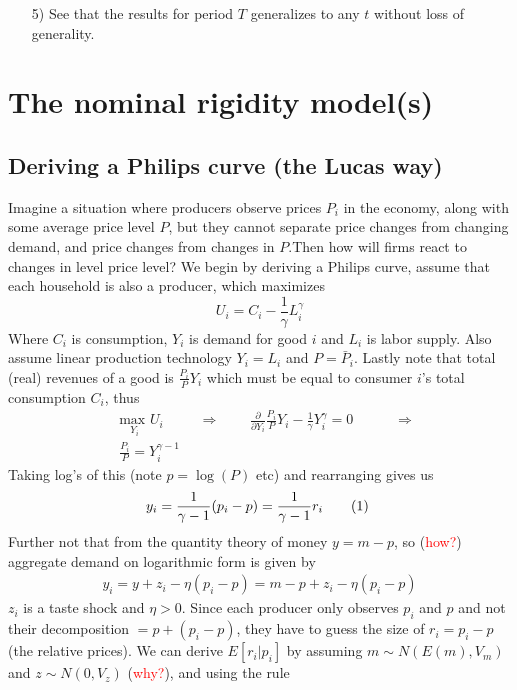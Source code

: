\documentclass[12pt, a4paper]{article}
\begin{document}
\begin{spacing}{1.213}
\begin{itemize}
\item[5)] See that the results for period $T$ generalizes to any $t$ without loss of generality.
\end{itemize}


\section{The nominal rigidity model(s)}
\subsection{Deriving a Philips curve (the Lucas way)}
Imagine a situation where producers observe prices $P_i$ in the economy, along with some average price level $P$, but they cannot separate price changes from changing demand, and price changes from changes in $P$.Then how will firms react to changes in level price level? We begin by deriving a Philips curve, assume that each household is also a producer, which maximizes
\begin{equation}
U_i = C_i - \frac{1}{\gamma}L_i^{\gamma}
\end{equation}
Where $C_i$ is consumption, $Y_i$ is demand for good $i$ and $L_i$ is labor supply. Also assume linear production technology $Y_i = L_i$ and $P = \bar{P}_i$. Lastly note that total (real) revenues of a good is $\frac{P_i}{P}Y_i$ which must be equal to consumer $i$'s total consumption $C_i$, thus
\begin{align*}
&\underset{Y_i}{\textrm{max }} U_i && \Rightarrow
&&& \frac{\partial }{\partial Y_i} \frac{P_i}{P}Y_i - \frac{1}{\gamma}Y_i^{\gamma}  = 0 &&&& \Rightarrow \\
&\frac{P_i}{P} = Y_i^{\gamma-1}
\end{align*}
Taking log's of this (note $p = \log(P)$ etc) and rearranging gives us
\begin{align*}
y_i = \frac{1}{\gamma -1 }(p_i - p) = \frac{1}{\gamma -1 }r_i
\stepcounter{equation}\tag{\theequation}\label{eq: ybasic}\
\end{align*}
Further not that from the quantity theory of money $y = m-p$, so (\textcolor{red}{how?}) aggregate demand on logarithmic form is given by 
\begin{align*}
y_i = y + z_i - \eta (p_i - p) = m-p + z_i - \eta (p_i - p)
\end{align*}
$z_i$ is a taste shock and $\eta>0$. Since each producer only observes $p_i$ and $p$ and not their decomposition $= p + (p_i - p)$, they have to guess the size of $r_i = p_i - p$ (the relative prices). We can derive $E[r_i | p_i ]$ by assuming $m \sim N(E(m),V_m)$ and $z \sim N(0,V_z)$ (\textcolor{red}{why?}), and using the rule 

\end{spacing}
\end{document}
